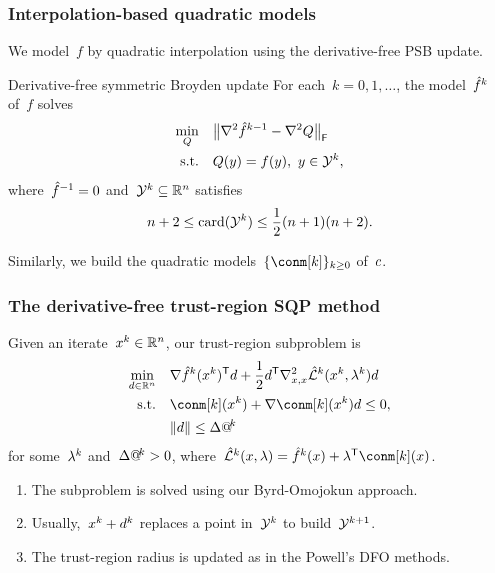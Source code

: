 \documentclass{polyu-presentation}
\makeatletter
\newcommand{\con}[1][]{c\ifthenelse{\equal{#1}{}}{}{_{#1}}}
\newcommand{\iter}[1][]{x\ifthenelse{\equal{#1}{}}{}{^{#1}}}
\newcommand{\lagm}[1][]{\hat{\mathcal{L}}\ifthenelse{\equal{#1}{}}{}{^{#1}}}
\newcommand{\lm}[1][]{\lambda\ifthenelse{\equal{#1}{}}{}{^{#1}}}
\newcommand{\obj}{f}
\newcommand{\objm}[1][]{\hat{f}\ifthenelse{\equal{#1}{}}{}{^{#1}}}
\newcommand{\rad}[1][]{\Delta\ifthenelse{\equal{#1}{}}{}{@\!^{#1}}}
\newcommand{\step}[1][]{d\ifthenelse{\equal{#1}{}}{}{^{#1}}}
\newcommand{\xpt}[1][]{\mathcal{Y}\ifthenelse{\equal{#1}{}}{}{^{#1}}}
\makeatother
\begin{document}
\begin{frame}
    \frametitle{Interpolation-based quadratic models}
    
	We model~$\obj$ by \alert{quadratic} interpolation using the derivative-free PSB update.

    \medskip

    \begin{block}{Derivative-free symmetric Broyden update \parencite{Powell_2004b}}
        For each~$k = 0, 1, \dots$, the model~$\objm[k]$ of~$\obj$ solves
        \begin{align*}
            \min_{Q}    & \quad \norm[\big]{\nabla^2 \objm[k - 1] - \nabla^2 Q}_{\mathsf{F}}\\
            \text{s.t.} & \quad Q(y) = \obj(y), ~ y \in \xpt[k],
        \end{align*}
        where~$\objm[-1] = 0$ and~$\xpt[k] \subseteq \R^n$ satisfies
        \begin{equation*}
            n + 2 \le \card(\xpt[k]) \le \frac{1}{2} (n + 1) (n + 2).
        \end{equation*}
    \end{block}

    \medskip

    Similarly, we build the quadratic models~$\set{\conm[k]}_{k \ge 0}$ of~$\con$.
\end{frame}

\begin{frame}
    \frametitle{The derivative-free trust-region SQP method}

    Given an iterate~$\iter[k] \in \R^n$, our \alert{trust-region} subproblem is
    \begin{align*}
        \min_{\step \in \R^n}   & \quad \nabla \objm[k](\iter[k])^{\T} \step + \frac{1}{2} \step^{\T} \nabla_{x, x}^2 \lagm[k](\iter[k], \lm[k]) \step\\
        \text{s.t.}             & \quad \conm[k](\iter[k]) + \nabla \conm[k](\iter[k]) \step \le 0,\\
                                & \quad \norm{\step} \le \rad[k]
    \end{align*}
    for some~$\lm[k]$ and~$\rad[k] > 0$, where~$\lagm[k](\iter, \lm) = \objm[k](\iter) + \lm^{\T} \conm[k](\iter)$.

    \bigskip

    \begin{block}{}
        \begin{enumerate}
            \item The subproblem is solved using our \alert{Byrd-Omojokun} approach.
            \item Usually,~$\iter[k] + \step[k]$ replaces a point in~$\xpt[k]$ to build~$\xpt[k + 1]$.
            \item The \alert{trust-region radius} is updated as in the Powell's DFO methods.
        \end{enumerate}
    \end{block}
\end{frame}
\end{document}
